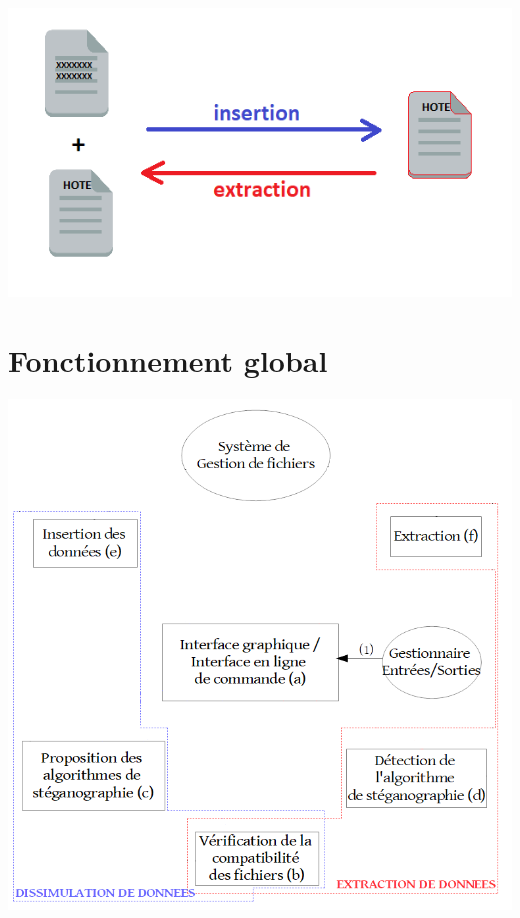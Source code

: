 \documentclass{beamer}
\begin{document}
  \begin{frame}
  \hspace{5cm}
  \includegraphics[scale=0.7]{pictures/definition2.png}
  \end{frame}
  

  \section{Fonctionnement global} 
    
  \begin{frame}
  \hspace{1.5cm}
  \includegraphics[scale=0.35]{pictures/organigramme_vide.png}
  \end{frame}
  
\end{document}
